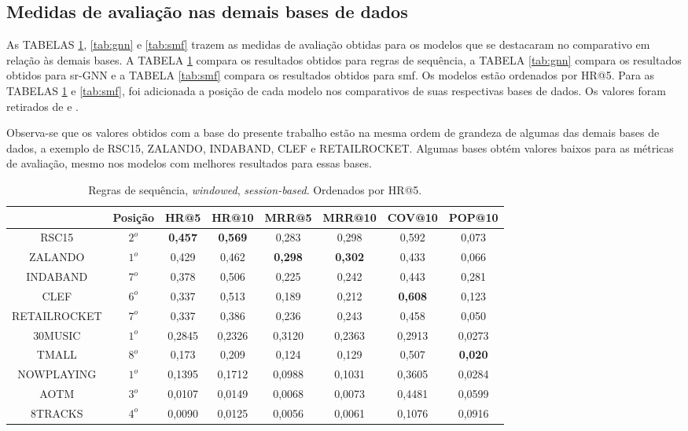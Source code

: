 \subsection{Medidas de avaliação nas demais bases de dados}
As TABELAS \ref{tab:sr}, \ref{tab:gnn} e \ref{tab:smf} trazem as medidas de
avaliação obtidas para os modelos que se destacaram no comparativo em relação às
demais bases. A TABELA \ref{tab:sr} compara os resultados obtidos para regras de
sequência, a TABELA \ref{tab:gnn} compara os resultados obtidos para sr-GNN e a
TABELA \ref{tab:smf} compara os resultados obtidos para smf. Os modelos estão
ordenados por HR@5. Para as TABELAS \ref{tab:sr} e \ref{tab:smf}, foi adicionada
a posição de cada modelo nos comparativos de suas respectivas bases de dados. Os
valores foram retirados de \citet{ludewig2020advances} e
\citet{shehzad2024performance}.

Observa-se que os valores obtidos com a base do presente trabalho estão na mesma
ordem de grandeza de algumas das demais bases de dados, a exemplo de RSC15,
ZALANDO, INDABAND, CLEF e RETAILROCKET. Algumas bases obtém
valores baixos para as métricas de avaliação, mesmo nos modelos com melhores
resultados para essas bases.

\begin{table}
\centering
\vspace{1mm}
\begin{tabular}{cccccccc}
\hline
 & Posição & HR@5 & HR@10 & MRR@5 & MRR@10 & COV@10 & POP@10 \\
\hline
RSC15& $2^o$ & \textbf{0,457} & \textbf{0,569} & 0,283 & 0,298 & 0,592 & 0,073 \\
ZALANDO& $1^o$ & 0,429 & 0,462 & \textbf{0,298} & \textbf{0,302} & 0,433 & 0,066 \\
INDABAND& $7^o$ & 0,378 & 0,506 & 0,225 & 0,242 & 0,443 & 0,281 \\
CLEF& $6^o$ & 0,337 & 0,513 & 0,189 & 0,212 & \textbf{0,608} & 0,123 \\
RETAILROCKET& $7^o$ &  0,337 & 0,386 & 0,236 & 0,243 & 0,458 & 0,050 \\
30MUSIC& $1^o$ & 0,2845 & 0,2326 & 0,3120  & 0,2363 & 0,2913 & 0,0273 \\
TMALL& $8^o$ &  0,173 & 0,209 & 0,124 & 0,129 & 0,507 & \textbf{0,020} \\
NOWPLAYING& $1^o$ & 0,1395 & 0,1712 & 0,0988 & 0,1031 & 0,3605 & 0,0284 \\
AOTM& $3^o$ & 0,0107 & 0,0149 & 0,0068 & 0,0073 & 0,4481 & 0,0599 \\
8TRACKS& $4^o$ & 0,0090 & 0,0125 & 0,0056 & 0,0061 & 0,1076 & 0,0916 \\
\hline
\end{tabular}
\caption{Regras de sequência, \textit{windowed}, \textit{session-based}. Ordenados por HR@5.}
\label{tab:sr}
\end{table}

